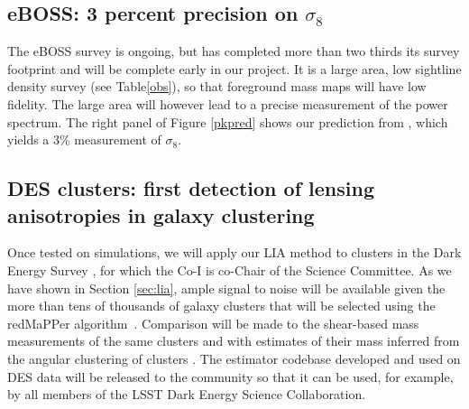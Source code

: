 \subsection{eBOSS: 3 percent precision on $\sigma_{8}$}
The eBOSS survey is ongoing, but has completed more than two thirds its survey
footprint and will be complete early in our project.
It is a large area, low sightline density survey (see Table\ref{obs}), so
that foreground mass maps will have low fidelity. The large area will
however lead to a precise measurement of the power spectrum.
The right panel of Figure \ref{pkpred} shows our prediction from 
\cite{metcalfandcroft}, which yields a 3\% measurement of $\sigma_{8}$.

\subsection{DES clusters: first detection of lensing anisotropies in
galaxy clustering}

Once tested on simulations, we will apply our
LIA method to clusters in the Dark Energy Survey \cite{des2016},
for which the Co-I is co-Chair of the Science Committee. 
As we have shown in Section \ref{sec:lia}, ample signal to noise will be
available given the more than tens of  thousands of galaxy clusters 
that will be selected using the redMaPPer algorithm~\cite{melchior2017}.
Comparison will be made to the shear-based
mass measurements of the same clusters \cite{simet2017} and with
estimates of their mass inferred from the angular clustering
of clusters \cite{baxter2016}.
The estimator codebase developed and used on DES data will
be released to the community so that it can be used, for example, by
all members of the LSST Dark Energy Science Collaboration.

